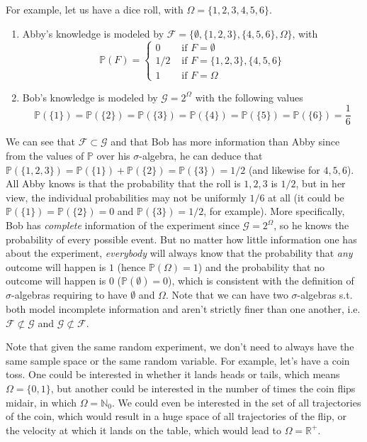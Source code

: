   For example, let us have a dice roll, with $\Omega = \{1, 2, 3, 4, 5, 6\}$.
  \begin{enumerate}
    \item Abby's knowledge is modeled by $\mathcal{F} = \{\emptyset, \{1, 2, 3\}, \{4, 5, 6\}, \Omega\}$, with 
    \begin{equation}
      \mathbb{P}(F) = \begin{cases} 
        0 & \text{ if } F = \emptyset \\
        1/2 & \text{ if } F = \{1, 2, 3\}, \{4, 5, 6\} \\ 
        1 & \text{ if } F = \Omega \end{cases}
    \end{equation}
    \item Bob's knowledge is modeled by $\mathcal{G} = 2^\Omega$ with the following values 
    \begin{equation}
      \mathbb{P}(\{1\}) = \mathbb{P}(\{2\}) = \mathbb{P}(\{3\}) = \mathbb{P}(\{4\}) = \mathbb{P}(\{5\}) = \mathbb{P}(\{6\}) = \frac{1}{6}
    \end{equation}
  \end{enumerate}
  We can see that $\mathcal{F} \subset \mathcal{G}$ and that Bob has more information than Abby since from the values of $\mathbb{P}$ over his $\sigma$-algebra, he can deduce that $\mathbb{P}(\{1, 2, 3\}) = \mathbb{P}(\{1\}) + \mathbb{P}(\{2\}) = \mathbb{P}(\{3\}) = 1/2$ (and likewise for $4, 5, 6$). All Abby knows is that the probability that the roll is $1, 2, 3$ is $1/2$, but in her view, the individual probabilities may not be uniformly $1/6$ at all (it could be $\mathbb{P}(\{1\}) = \mathbb{P}(\{2\}) = 0$ and $\mathbb{P}(\{3\}) = 1/2$, for example). More specifically, Bob has \textit{complete} information of the experiment since $\mathcal{G} = 2^\Omega$, so he knows the probability of every possible event. But no matter how little information one has about the experiment, \textit{everybody} will always know that the probability that \textit{any} outcome will happen is $1$ (hence $\mathbb{P}(\Omega) = 1$) and the probability that no outcome will happen is $0$ ($\mathbb{P}(\emptyset) = 0$), which is consistent with the definition of $\sigma$-algebras requiring to have $\emptyset$ and $\Omega$. Note that we can have two $\sigma$-algebras s.t. both model incomplete information and aren't strictly finer than one another, i.e. $\mathcal{F} \not\subset \mathcal{G}$ and $\mathcal{G} \not\subset \mathcal{F}$. 

  Note that given the same random experiment, we don't need to always have the same sample space or the same random variable. For example, let's have a coin toss. One could be interested in whether it lands heads or tails, which means $\Omega = \{0, 1\}$, but another could be interested in the number of times the coin flips midair, in which $\Omega = \mathbb{N}_0$. We could even be interested in the set of all trajectories of the coin, which would result in a huge space of all trajectories of the flip, or the velocity at which it lands on the table, which would lead to $\Omega = \mathbb{R}^+$. 

